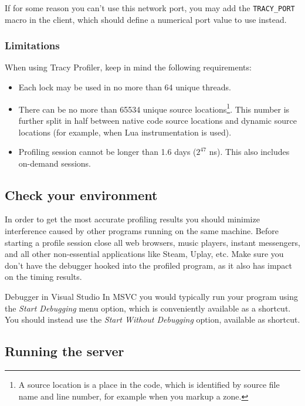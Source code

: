 \documentclass[hidelinks,titlepage,a4paper]{article}
\begin{document}
If for some reason you can't use this network port, you may add the \texttt{TRACY\_PORT} macro in the client, which should define a numerical port value to use instead.

\subsubsection{Limitations}

When using Tracy Profiler, keep in mind the following requirements:

\begin{itemize}
\item Each lock may be used in no more than 64 unique threads.
\item There can be no more than 65534 unique source locations\footnote{A source location is a place in the code, which is identified by source file name and line number, for example when you markup a zone.}. This number is further split in half between native code source locations and dynamic source locations (for example, when Lua instrumentation is used).
\item Profiling session cannot be longer than 1.6 days ($2^{47}$ \si{\nano\second}). This also includes on-demand sessions.
\end{itemize}

\subsection{Check your environment}
\label{checkenvironment}

In order to get the most accurate profiling results you should minimize interference caused by other programs running on the same machine. Before starting a profile session close all web browsers, music players, instant messengers, and all other non-essential applications like Steam, Uplay, etc. Make sure you don't have the debugger hooked into the profiled program, as it also has impact on the timing results.

\begin{bclogo}[
noborder=true,
couleur=black!5,
logo=\bclampe
]{Debugger in Visual Studio}
In MSVC you would typically run your program using the \emph{Start Debugging} menu option, which is conveniently available as a  shortcut. You should instead use the \emph{Start Without Debugging} option, available as  shortcut.
\end{bclogo}

\subsection{Running the server}
\end{document}
